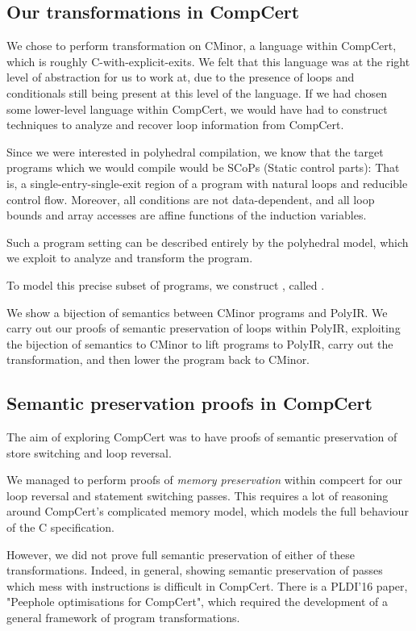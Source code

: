 \documentclass{article}
\begin{document}
\subsection{Our transformations in CompCert}

We chose to perform transformation on CMinor, a language within CompCert, which is roughly C-with-explicit-exits. We felt
that this language was at the right level of abstraction for us to work at, due to the presence of loops and conditionals
still being present at this level of the language. If we had chosen some lower-level language within CompCert, we would
have had to construct techniques to analyze and recover loop information from CompCert.

Since we were interested in polyhedral compilation, we know that the target programs which we would compile would be 
SCoPs (Static control parts): That is, a single-entry-single-exit region of a program with natural loops and
reducible control flow. Moreover, all conditions are not data-dependent, and all loop bounds and array accesses 
are affine functions of the induction variables. 

Such a program setting can be described entirely by the polyhedral model, which we exploit to analyze and transform
the program.

To model this precise subset of programs, we construct , called .

We show a bijection of semantics between CMinor programs and PolyIR. We carry out our proofs of semantic preservation
of loops within PolyIR, exploiting the bijection of semantics to CMinor to lift programs to PolyIR, carry out the
transformation, and then lower the program back to CMinor.


\subsection{Semantic preservation proofs in CompCert}
The aim of exploring CompCert was to have proofs of semantic preservation of store switching and
loop reversal. 

We managed to perform proofs of \textit{memory preservation} within compcert for our loop reversal and statement switching passes.
This requires a lot of reasoning around CompCert's complicated memory model, which models the full behaviour of the C
specification.


However, we did not prove full semantic preservation of either of these transformations. Indeed, in general, showing 
semantic preservation of passes which mess with instructions is difficult in CompCert. There is a PLDI'16 paper, 
"Peephole optimisations for CompCert", which required the development of a general framework of program transformations.
\end{document}
